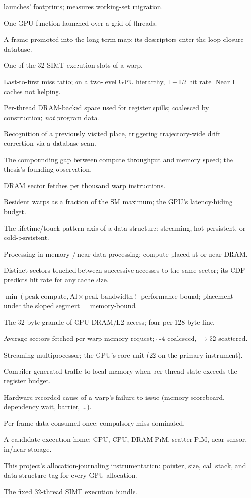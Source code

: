 \begin{description}
launches' footprints; measures working-set migration.
\item[Kernel] One GPU function launched over a grid of threads.
\item[Keyframe] A frame promoted into the long-term map; its descriptors
enter the loop-closure database.
\item[Lane] One of the 32 SIMT execution slots of a warp.
\item[LFMR] Last-to-first miss ratio; on a two-level GPU hierarchy,
$1 - \text{L2 hit rate}$. Near 1 = caches not helping.
\item[Local memory] Per-thread DRAM-backed space used for register spills;
coalesced by construction; \emph{not} program data.
\item[Loop closure] Recognition of a previously visited place, triggering
trajectory-wide drift correction via a database scan.
\item[Memory wall] The compounding gap between compute throughput and
memory speed; the thesis's founding observation.
\item[MPKI] DRAM sector fetches per thousand warp instructions.
\item[Occupancy] Resident warps as a fraction of the SM maximum; the GPU's
latency-hiding budget.
\item[Persistence] The lifetime/touch-pattern axis of a data structure:
streaming, hot-persistent, or cold-persistent.
\item[PiM / NDP] Processing-in-memory / near-data processing; compute
placed at or near DRAM.
\item[Reuse distance] Distinct sectors touched between successive accesses
to the same sector; its CDF predicts hit rate for any cache size.
\item[Roofline] $\min(\text{peak compute}, \text{AI} \times \text{peak
bandwidth})$ performance bound; placement under the sloped segment =
memory-bound.
\item[Sector] The 32-byte granule of GPU DRAM/L2 access; four per 128-byte
line.
\item[Sectors per request] Average sectors fetched per warp memory
request; $\sim$4 coalesced, $\rightarrow$32 scattered.
\item[SM] Streaming multiprocessor; the GPU's core unit (22 on the primary
instrument).
\item[Spill (register)] Compiler-generated traffic to local memory when
per-thread state exceeds the register budget.
\item[Stall reason] Hardware-recorded cause of a warp's failure to issue
(memory scoreboard, dependency wait, barrier, \ldots).
\item[Streaming] Per-frame data consumed once; compulsory-miss dominated.
\item[Substrate] A candidate execution home: GPU, CPU, DRAM-PiM,
scatter-PiM, near-sensor, in/near-storage.
\item[TaggedAllocator] This project's allocation-journaling
instrumentation: pointer, size, call stack, and data-structure tag for
every GPU allocation.
\item[Warp] The fixed 32-thread SIMT execution bundle.
\end{description}
